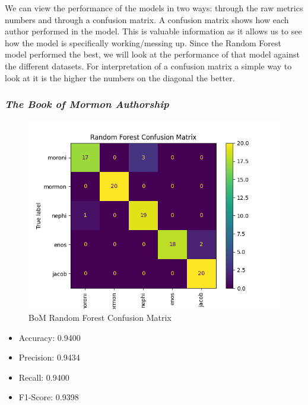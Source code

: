 \documentclass[
  letterpaper,
  DIV=11,
  numbers=noendperiod]{scrartcl}
\providecommand{\tightlist}{%
  \setlength{\itemsep}{0pt}\setlength{\parskip}{0pt}}\usepackage{longtable,booktabs,array}
\begin{document}
We can view the performance of the models in two ways: through the raw
metrics numbers and through a confusion matrix. A confusion matrix shows
how each author performed in the model. This is valuable information as
it allows us to see how the model is specifically working/messing up.
Since the Random Forest model performed the best, we will look at the
performance of that model against the different datasets. For
interpretation of a confusion matrix a simple way to look at it is the
higher the numbers on the diagonal the better.

\hypertarget{the-book-of-mormon-authorship}{%
\subsubsection{\texorpdfstring{\emph{The Book of Mormon
Authorship}}{The Book of Mormon Authorship}}\label{the-book-of-mormon-authorship}}

\begin{figure}

{\centering \includegraphics{Graphs/BoM/rf.png}

}

\caption{BoM Random Forest Confusion Matrix}

\end{figure}

\begin{itemize}
\tightlist
\item
  Accuracy: 0.9400
\item
  Precision: 0.9434
\item
  Recall: 0.9400
\item
  F1-Score: 0.9398
\end{itemize}
\end{document}
